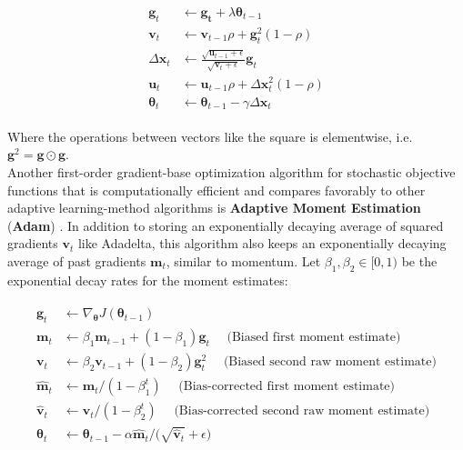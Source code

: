 \begin{align}
    \label{eqn:Adadelta}
    \begin{split}
        \mathbf{g}_t &\gets \mathbf{g_t} + \lambda \boldsymbol{\theta}_{t-1}\\
        \mathbf{v}_t &\gets \mathbf{v}_{t-1} \rho + \mathbf{g}_t^2 (1-\rho)\\
        \Delta \mathbf{x}_t &\gets \frac{\sqrt{\mathbf{u}_{t-1} + \epsilon}}{\sqrt{\mathbf{v}_t + \epsilon}} \mathbf{g}_t\\
        \mathbf{u}_t &\gets \mathbf{u}_{t-1} \rho + \Delta \mathbf{x}_t^2 (1-\rho)\\
        \boldsymbol{\theta}_t &\gets \boldsymbol{\theta}_{t-1} - \gamma \Delta \mathbf{x}_t
    \end{split}
\end{align}

Where the operations between vectors like the square is elementwise, i.e. $\mathbf{g}^2 = \mathbf{g} \odot \mathbf{g}$.\\
Another first-order gradient-base optimization algorithm for stochastic objective functions that is computationally efficient and compares favorably to other adaptive learning-method algorithms is \textbf{Adaptive Moment Estimation} (\textbf{Adam}) \cite{kingma2017}. In addition to storing an exponentially decaying average of squared gradients $\mathbf{v}_t$ like Adadelta, this algorithm also keeps an exponentially decaying average of past gradients $\mathbf{m}_t$, similar to momentum.
Let $\beta_1, \beta_2 \in [0,1)$ be the exponential decay rates for the moment estimates:

\begin{align}
    \label{eqn:Adam}
    \begin{split}
    \mathbf{g}_t &\gets \nabla_{\boldsymbol{\theta}} J(\boldsymbol{\theta}_{t-1}) \\
    \mathbf{m}_t &\gets \beta_1 \mathbf{m}_{t-1} + (1-\beta_1)\mathbf{g}_t \quad \text{ (Biased first moment estimate)}\\
    \mathbf{v}_t &\gets \beta_2 \mathbf{v}_{t-1} + (1-\beta_2) \mathbf{g}_t^2 \quad \text{ (Biased second raw moment estimate)}\\
    \mathbf{\hat{m}}_t &\gets \mathbf{m}_t / (1-\beta_1^t) \quad \text{ (Bias-corrected first moment estimate)}\\
    \mathbf{\hat{v}}_t &\gets \mathbf{v}_t / (1-\beta_2^t) \quad \text{ (Bias-corrected second raw moment estimate)}\\
    \boldsymbol{\theta}_t &\gets \boldsymbol{\theta}_{t-1} - \alpha \mathbf{\hat{m}}_t / \bigl( \sqrt{\mathbf{\hat{v}}_t} + \epsilon \bigr)
    \end{split}
\end{align}

